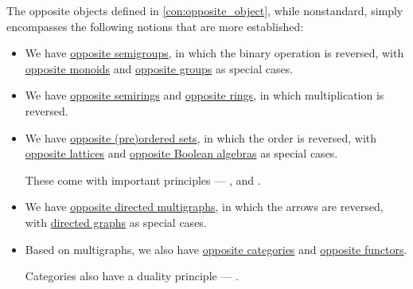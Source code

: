 \begin{remark}\label{rem:con:opposite_object}
  The opposite objects defined in \cref{con:opposite_object}, while nonstandard, simply encompasses the following notions that are more established:
  \begin{itemize}
    \item We have \hyperref[def:semigroup/opposite]{opposite semigroups}, in which the binary operation is reversed, with \hyperref[def:monoid/opposite]{opposite monoids} and \hyperref[def:group/opposite]{opposite groups} as special cases.

    \item We have \hyperref[def:semiring/opposite]{opposite semirings} and \hyperref[def:ring/opposite]{opposite rings}, in which multiplication is reversed.

    \item We have \hyperref[def:partially_ordered_set/opposite]{opposite (pre)ordered sets}, in which the order is reversed, with \hyperref[def:lattice/opposite]{opposite lattices} and \hyperref[def:boolean_algebra/opposite]{opposite Boolean algebras} as special cases.

    These come with important principles --- ,  and .

    \item We have \hyperref[def:directed_multigraph/opposite_arcs]{opposite directed multigraphs}, in which the arrows are reversed, with \hyperref[def:directed_graph]{directed graphs} as special cases.

    \item Based on multigraphs, we also have \hyperref[def:opposite_category]{opposite categories} and \hyperref[def:opposite_functor]{opposite functors}.

    Categories also have a duality principle --- .
  \end{itemize}
\end{remark}

